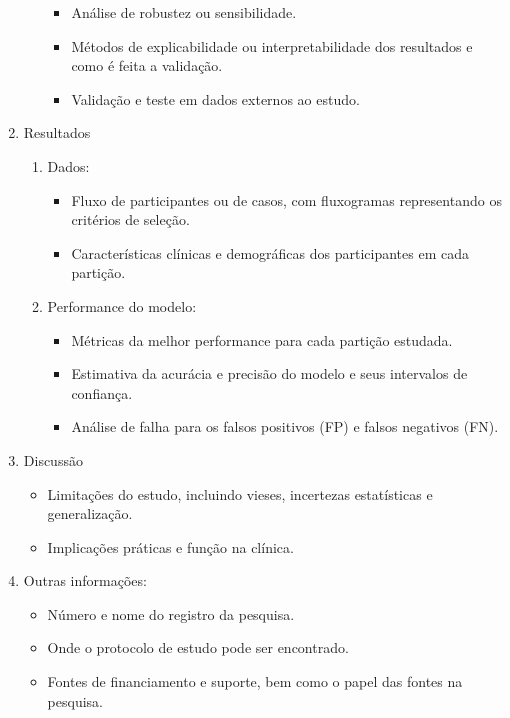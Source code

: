 \begin{enumerate}
\begin{enumerate}
\begin{itemize}
            \item Análise de robustez ou sensibilidade.
            \item Métodos de explicabilidade ou interpretabilidade dos resultados e como é feita a validação.
            \item Validação e teste em dados externos ao estudo.
        \end{itemize}
    \end{enumerate}
    \item Resultados
    \begin{enumerate}
        \item Dados:
        \begin{itemize}
            \item Fluxo de participantes ou de casos, com fluxogramas representando os critérios de seleção.
            \item Características clínicas e demográficas dos participantes em cada partição.
        \end{itemize}
        \item Performance do modelo:
        \begin{itemize}
            \item Métricas da melhor performance para cada partição estudada.
            \item Estimativa da acurácia e precisão do modelo e seus intervalos de confiança.
            \item Análise de falha para os falsos positivos (FP) e falsos negativos (FN).
        \end{itemize}
    \end{enumerate}
    \item Discussão
    \begin{itemize}
        \item Limitações do estudo, incluindo vieses, incertezas estatísticas e generalização.
        \item Implicações práticas e função na clínica.
    \end{itemize}
    \item Outras informações:
    \begin{itemize}
        \item Número e nome do registro da pesquisa.
        \item Onde o protocolo de estudo pode ser encontrado.
        \item Fontes de financiamento e suporte, bem como o papel das fontes na pesquisa.
    \end{itemize}
\end{enumerate}
